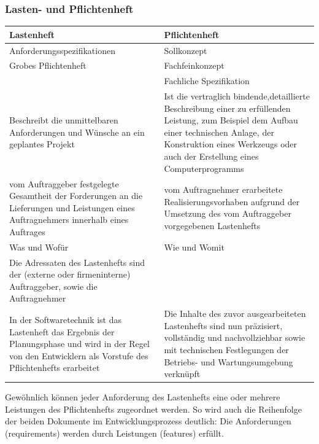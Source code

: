 \subsubsection{Lasten- und Pflichtenheft}

\begin{tabular}{ | p{} |
p{} | }
		\hline
		{\bf Lastenheft} & {\bf Pflichtenheft}\\
		\hline
		Anforderungsspezifikationen & Sollkonzept\\
		Grobes Pflichtenheft & Fachfeinkonzept\\
		& Fachliche Spezifikation\\
		\hline
		Beschreibt die unmittelbaren Anforderungen und Wünsche an ein geplantes Projekt & Ist die vertraglich bindende,detaillierte Beschreibung einer zu erfüllenden Leistung, zum Beispiel dem Aufbau einer technischen Anlage, der Konstruktion eines Werkzeugs oder auch der Erstellung eines Computerprogramms\\
		\hline
		vom Auftraggeber festgelegte Gesamtheit der Forderungen an die Lieferungen und Leistungen eines Auftragnehmers innerhalb eines Auftrages & vom Auftragnehmer erarbeitete Realisierungsvorhaben aufgrund der Umsetzung des vom Auftraggeber vorgegebenen Lastenhefts\\
		\hline
		Was und Wofür & Wie und Womit\\
		\hline
		Die Adressaten des Lastenhefts sind der (externe oder firmeninterne) Auftraggeber, sowie die Auftragnehmer &\\
		\hline
		In der Softwaretechnik ist das Lastenheft das Ergebnis der Planungsphase und wird in der Regel von den Entwicklern als Vorstufe des Pflichtenhefts erarbeitet & Die Inhalte des zuvor ausgearbeiteten Lastenhefts sind nun präzisiert, vollständig und nachvollziehbar sowie mit technischen Festlegungen der Betriebs- und Wartungsumgebung verknüpft\\
		\hline
\end{tabular}\newline

Gewöhnlich können jeder Anforderung des Lastenhefts eine oder mehrere Leistungen des Pflichtenhefts zugeordnet werden. So wird auch die Reihenfolge der beiden Dokumente im Entwicklungsprozess deutlich: Die Anforderungen (requirements) werden durch Leistungen (features) erfüllt.\newline

